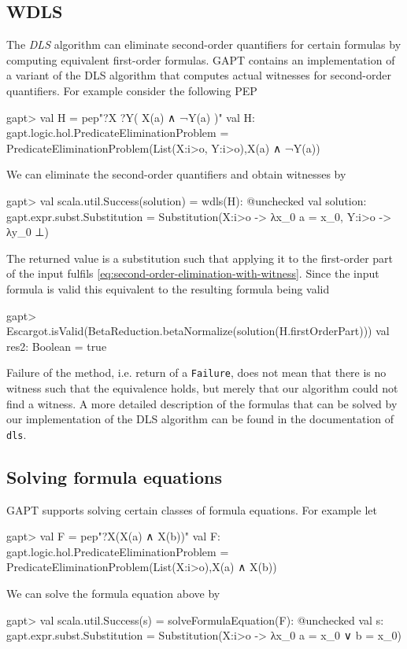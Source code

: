 \documentclass[a4paper,11pt]{book}
\begin{document}
\subsection{WDLS}

The \emph{DLS} algorithm \cite{Doherty1997Computing} can eliminate second-order quantifiers for certain formulas by computing equivalent first-order formulas.
GAPT contains an implementation of a variant of the DLS algorithm that computes actual witnesses for second-order quantifiers.
For example consider the following PEP
\begin{clilisting}
  gapt> val H = pep"?X ?Y( X(a) ∧ ¬Y(a) )"
  val H: gapt.logic.hol.PredicateEliminationProblem = PredicateEliminationProblem(List(X:i>o, Y:i>o),X(a) ∧ ¬Y(a))

\end{clilisting}
We can eliminate the second-order quantifiers and obtain witnesses by
\begin{clilisting}
  gapt> val scala.util.Success(solution) = wdls(H): @unchecked
  val solution: gapt.expr.subst.Substitution = Substitution(X:i>o -> λx_0 a = x_0, Y:i>o -> λy_0 ⊥)

\end{clilisting}
The returned value is a substitution such that applying it to the first-order part of the input fulfils \eqref{eq:second-order-elimination-with-witness}.
Since the input formula is valid this equivalent to the resulting formula being valid
\begin{clilisting}
  gapt> Escargot.isValid(BetaReduction.betaNormalize(solution(H.firstOrderPart)))
  val res2: Boolean = true

\end{clilisting}
Failure of the method, i.e. return of a \texttt{Failure}, does not mean that there is no witness such that the equivalence holds, but merely that our algorithm could not find a witness.
A more detailed description of the formulas that can be solved by our implementation of the DLS algorithm can be found in the documentation of \texttt{dls}.

\subsection{Solving formula equations}
GAPT supports solving certain classes of formula equations.
For example let
\begin{clilisting}
  gapt> val F = pep"?X(X(a) ∧ X(b))"
  val F: gapt.logic.hol.PredicateEliminationProblem = PredicateEliminationProblem(List(X:i>o),X(a) ∧ X(b))

\end{clilisting}
We can solve the formula equation above by
\begin{clilisting}
  gapt> val scala.util.Success(s) = solveFormulaEquation(F): @unchecked
  val s: gapt.expr.subst.Substitution = Substitution(X:i>o -> λx_0 a = x_0 ∨ b = x_0)

\end{clilisting}
\end{document}
